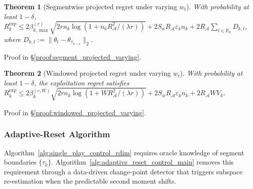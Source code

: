 \documentclass{article}
\newcommand{\cA}{\mathcal{A}}
\newtheorem{theorem}{Theorem}
\begin{document}
\begin{theorem}[Segmentwise projected regret under varying $w_t$]
\label{thm:segment_projected_varying}
With probability at least $1-\delta$,
$R_k^{\mathrm{exp}} \le 2\beta_{k,\max}^{(r)} \sqrt{2rn_k\log(1+n_kR_{\cA}^2/(\lambda r))} + 2S_wR_{\cA}\varepsilon_k n_k + 2R_{\cA} \sum_{t\in E_k} D_{k,t}$,
where $D_{k,t} := \|\theta_t - \theta_{\tau_{k-1}}\|_2$.
\end{theorem}

Proof in \S\ref{proof:segment_projected_varying}.

\begin{theorem}[Windowed projected regret under varying $w_t$]
\label{thm:windowed_projected_varying}
With probability at least $1-\delta$, the exploitation regret satisfies
$R_k^{\mathrm{exp}} \le 2\beta_k^{(r,W)} \sqrt{2rn_k\log(1+WR_{\cA}^2/(\lambda r))} + 2S_wR_{\cA}\varepsilon_k n_k + 2R_{\cA} W V_k$.
\end{theorem}

Proof in \S\ref{proof:windowed_projected_varying}.

\subsubsection{Adaptive-Reset Algorithm}
\label{app:adaptive_pseudocode}


Algorithm~\ref{alg:single_play_control_rdim} requires oracle knowledge of
  segment boundaries $\{\tau_k\}$.  Algorithm~\ref{alg:adaptive_reset_control_main}
  removes this requirement through a data-driven change-point detector that
  triggers subspace re-estimation when the predictable second moment shifts.
\end{document}
